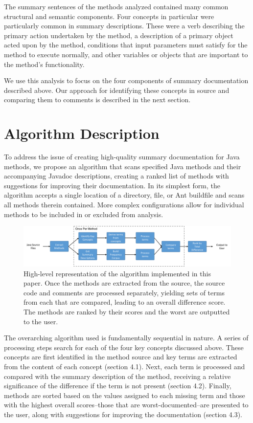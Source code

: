 \documentclass[preprint]{sigplanconf}
\begin{document}
The summary sentences of the methods analyzed contained many common structural and semantic components. Four concepts in particular were particularly common in summary descriptions. These were a verb describing the primary action undertaken by the method, a description of a primary object acted upon by the method, conditions that input parameters must satisfy for the method to execute normally, and other variables or objects that are important to the method's functionality.

We use this analysis to focus on the four components of summary documentation described above. Our approach for identifying these concepts in source and comparing them to comments is described in the next section.

\section{Algorithm Description}
To address the issue of creating high-quality summary documentation for Java methods, we propose an algorithm that scans specified Java methods and their accompanying Javadoc descriptions, creating a ranked list of methods with suggestions for improving their documentation. In its simplest form, the algorithm accepts a single location of a directory, file, or Ant buildfile and scans all methods therein contained. More complex configurations allow for individual methods to be included in or excluded from analysis.

\begin{figure}
	\begin{center}
		\includegraphics[width=\linewidth]{algorithm-structure.png}
	\end{center}
	\caption{High-level representation of the algorithm implemented in this paper. Once the methods are extracted from the source, the source code and comments are processed separately, yielding sets of terms from each that are compared, leading to an overall difference score. The methods are ranked by their scores and the worst are outputted to the user.}
	\label{figure-algorithm-summary}
\end{figure}

The overarching algorithm used is fundamentally sequential in nature. A series of processing steps search for each of the four key concepts discussed above. These concepts are first identified in the method source and key terms are extracted from the content of each concept (section 4.1). Next, each term is processed and compared with the summary description of the method, receiving a relative significance of the difference if the term is not present (section 4.2). Finally, methods are sorted based on the values assigned to each missing term and those with the highest overall scores--those that are worst-documented--are presented to the user, along with suggestions for improving the documentation (section 4.3).
\end{document}
